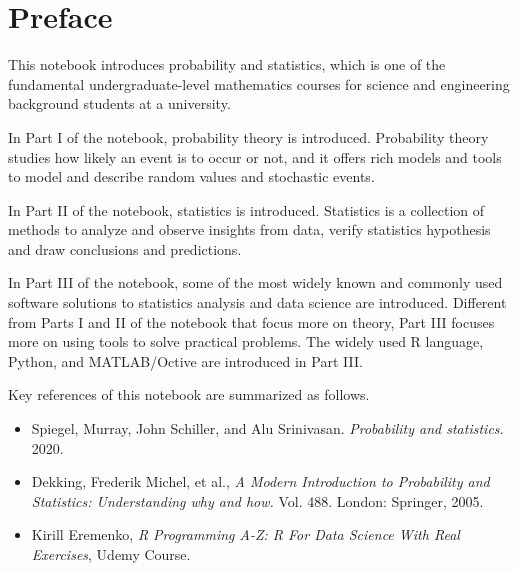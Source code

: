 \chapter*{Preface}

This notebook introduces probability and statistics, which is one of the fundamental undergraduate-level mathematics courses for science and engineering background students at a university.

In Part I of the notebook, probability theory is introduced. Probability theory studies how likely an event is to occur or not, and it offers rich models and tools to model and describe random values and stochastic events.

In Part II of the notebook, statistics is introduced. Statistics is a collection of methods to analyze and observe insights from data, verify statistics hypothesis and draw conclusions and predictions.

In Part III of the notebook, some of the most widely known and commonly used software solutions to statistics analysis and data science are introduced. Different from Parts I and II of the notebook that focus more on theory, Part III focuses more on using tools to solve practical problems. The widely used R language, Python, and MATLAB/Octive are introduced in Part III.

Key references of this notebook are summarized as follows.

\begin{itemize}
  \item Spiegel, Murray, John Schiller, and Alu Srinivasan. \textit{Probability and statistics.} 2020.
  \item Dekking, Frederik Michel, et al., \textit{A Modern Introduction to Probability and Statistics: Understanding why and how.} Vol. 488. London: Springer, 2005.
  \item Kirill Eremenko, \textit{R Programming A-Z: R For Data Science With Real Exercises}, Udemy Course.
\end{itemize}
